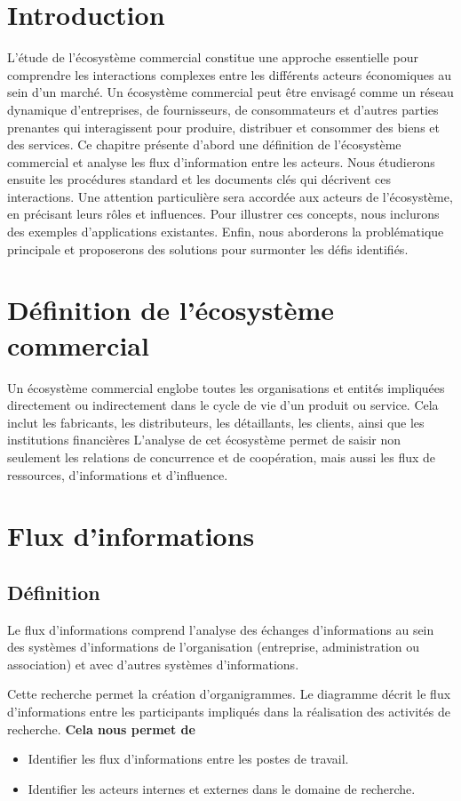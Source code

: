 \documentclass[edit,12pt,a4paper,ChapStyle,oneside,doubleinterligne]{report}
\begin{document}
\section{Introduction}
L'étude de l'écosystème commercial constitue une approche essentielle pour comprendre les interactions complexes entre les différents acteurs économiques au sein d'un marché. Un écosystème commercial peut être envisagé comme un réseau dynamique d'entreprises, de fournisseurs, de consommateurs et d'autres parties prenantes qui interagissent pour produire, distribuer et consommer des biens et des services.
\newline  Ce chapitre présente d'abord une définition de l'écosystème commercial et analyse les flux d'information entre les acteurs. Nous étudierons ensuite les procédures standard et les documents clés qui décrivent ces interactions. Une attention particulière sera accordée aux acteurs de l'écosystème, en précisant leurs rôles et influences.
\newline  Pour illustrer ces concepts, nous inclurons des exemples d'applications existantes. Enfin, nous aborderons la problématique principale et proposerons des solutions pour surmonter les défis identifiés.
\section{Définition de l'écosystème commercial}
Un écosystème commercial englobe toutes les organisations et entités impliquées directement ou indirectement dans le cycle de vie d'un produit ou service. Cela inclut les fabricants, les distributeurs, les détaillants, les clients, ainsi que les institutions financières L'analyse de cet écosystème permet de saisir non seulement les relations de concurrence et de coopération, mais aussi les flux de ressources, d'informations et d'influence.
\cite{1}
\section{Flux d'informations}
\subsection{Définition}


Le flux d'informations comprend l'analyse des échanges d'informations au sein des systèmes d'informations de l'organisation (entreprise, administration ou association) et avec d'autres systèmes d'informations.


Cette recherche permet la création d'organigrammes. Le diagramme décrit le flux d'informations entre les participants impliqués dans la réalisation des activités de recherche.
\cite{flux}
\textbf{Cela nous permet de}
\begin{itemize}
    \item Identifier les flux d'informations entre les postes de travail.
    \item Identifier les acteurs internes et externes dans le domaine de recherche.
\end{itemize}
\end{document}
